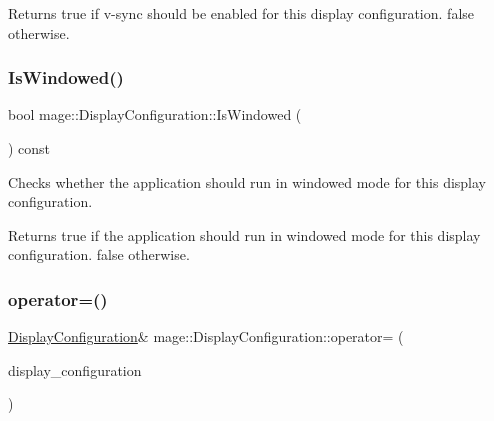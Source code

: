 \begin{DoxyReturn}{Returns}
{\ttfamily true} if v-\/sync should be enabled for this display configuration. {\ttfamily false} otherwise. 
\end{DoxyReturn}
\hypertarget{structmage_1_1_display_configuration_ae35fedcd9989950c5f15785632dd7a86}{}\label{structmage_1_1_display_configuration_ae35fedcd9989950c5f15785632dd7a86} 
\subsubsection{\texorpdfstring{Is\+Windowed()}{IsWindowed()}}
{\footnotesize\ttfamily bool mage\+::\+Display\+Configuration\+::\+Is\+Windowed (\begin{DoxyParamCaption}{ }\end{DoxyParamCaption}) const\hspace{0.3cm}{\ttfamily [noexcept]}}

Checks whether the application should run in windowed mode for this display configuration.

\begin{DoxyReturn}{Returns}
{\ttfamily true} if the application should run in windowed mode for this display configuration. {\ttfamily false} otherwise. 
\end{DoxyReturn}
\hypertarget{structmage_1_1_display_configuration_a43d4997e418b27add46442e88ba3672b}{}\label{structmage_1_1_display_configuration_a43d4997e418b27add46442e88ba3672b} 
\subsubsection{\texorpdfstring{operator=()}{operator=()}\hspace{0.1cm}{\footnotesize\ttfamily [1/2]}}
{\footnotesize\ttfamily \hyperlink{structmage_1_1_display_configuration}{Display\+Configuration}\& mage\+::\+Display\+Configuration\+::operator= (\begin{DoxyParamCaption}\item[{const \hyperlink{structmage_1_1_display_configuration}{Display\+Configuration} \&}]{display\+\_\+configuration }\end{DoxyParamCaption})\hspace{0.3cm}{\ttfamily [default]}}


